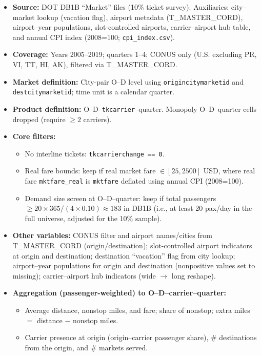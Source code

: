 \documentclass{article}
\begin{document}
\begin{itemize}
  \item \textbf{Source:} DOT DB1B ``Market'' files (10\% ticket survey). Auxiliaries: city--market lookup (vacation flag), airport metadata (T\_MASTER\_CORD), airport--year populations, slot-controlled airports, carrier--airport hub table, and annual CPI index (2008{=}100; \texttt{cpi\_index.csv}).
  \item \textbf{Coverage:} Years 2005--2019; quarters 1--4; CONUS only (U.S. excluding PR, VI, TT, HI, AK), filtered via T\_MASTER\_CORD.
  \item \textbf{Market definition:} City-pair O--D level using \texttt{origincitymarketid} and \texttt{destcitymarketid}; time unit is a calendar quarter.
  \item \textbf{Product definition:} O--D--\texttt{tkcarrier}--quarter. Monopoly O--D--quarter cells dropped (require $\ge 2$ carriers).
  \item \textbf{Core filters:}
  \begin{itemize}
    \item No interline tickets: \texttt{tkcarrierchange == 0}.
    \item Real fare bounds: keep if real market fare $\in[25, 2500]$ USD, where real fare \texttt{mktfare\_real} is \texttt{mktfare} deflated using annual CPI (2008{=}100).
    \item Demand size screen at O--D--quarter: keep if total passengers $\ge 20 \times 365 / (4 \times 0.10) \approx 183$ in DB1B (i.e., at least 20 pax/day in the full universe, adjusted for the 10\% sample).
  \end{itemize}
\item \textbf{Other variables:} CONUS filter and airport names/cities from T\_MASTER\_CORD (origin/destination); slot-controlled airport indicators at origin and destination; destination ``vacation'' flag from city lookup; airport--year populations for origin and destination (nonpositive values set to missing); carrier--airport hub indicators (wide $\to$ long reshape).
  \item \textbf{Aggregation (passenger-weighted) to O--D--carrier--quarter:}
  \begin{itemize}
    \item Average distance, nonstop miles, and fare; share of nonstop; extra miles $=$ distance $-$ nonstop miles.
    \item Carrier presence at origin (origin--carrier passenger share), \# destinations from the origin, and \# markets served.

\end{itemize}
\end{itemize}
\end{document}
